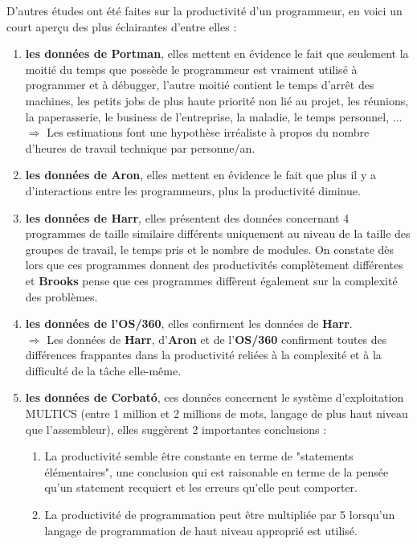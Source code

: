 \documentclass[runningheads]{llncs}
\begin{document}
D'autres études ont été faites sur la productivité d'un programmeur, en voici un court aperçu des plus éclairantes d'entre elles :
\begin{enumerate}
\item \textbf{les données de Portman}, elles mettent en évidence le fait que seulement la moitié du temps que possède le 
programmeur est vraiment utilisé à programmer et à débugger, l'autre moitié contient le temps d'arrêt des machines, les petits 
jobs de plus haute priorité non lié au projet, les réunions, la paperasserie, le business de l'entreprise, la maladie, le temps 
personnel, ... \\
$\Rightarrow$ Les estimations font une hypothèse irréaliste à propos du nombre d'heures de travail technique par 
personne/an.
\item \textbf{les données de Aron}, elles mettent en évidence le fait que plus il y a d'interactions entre les programmeurs, plus 
la productivité diminue.
\item \textbf{les données de Harr}, elles présentent des données concernant 4 programmes de taille similaire différents uniquement
au niveau de la taille des groupes de travail, le temps pris et le nombre de modules. On constate dès lors que ces programmes 
donnent des productivités complètement différentes et \textbf{Brooks} pense que ces programmes diffèrent également sur la 
complexité des problèmes.
\item \textbf{les données de l'OS/360}, elles confirment les données de \textbf{Harr}. \\
$\Rightarrow$ Les données de \textbf{Harr}, d'\textbf{Aron} et de l'\textbf{OS/360} confirment toutes des différences frappantes 
dans la productivité reliées à la complexité et à la difficulté de la tâche elle-même. 
\item \textbf{les données de Corbató}, ces données concernent le système d'exploitation MULTICS (entre 1 million et 2 millions de 
mots, langage de plus haut niveau que l'assembleur), elles suggèrent 2 importantes conclusions :
	\begin{enumerate}
	\item La productivité semble être constante en terme de "statements élémentaires", une conclusion qui est raisonable en terme 
	de la pensée qu'un statement recquiert et les erreurs qu'elle peut comporter.
	\item La productivité de programmation peut être multipliée par 5 lorsqu'un langage de programmation de haut niveau approprié 
	est utilisé.
	\end{enumerate}
\end{enumerate}
\end{document}
